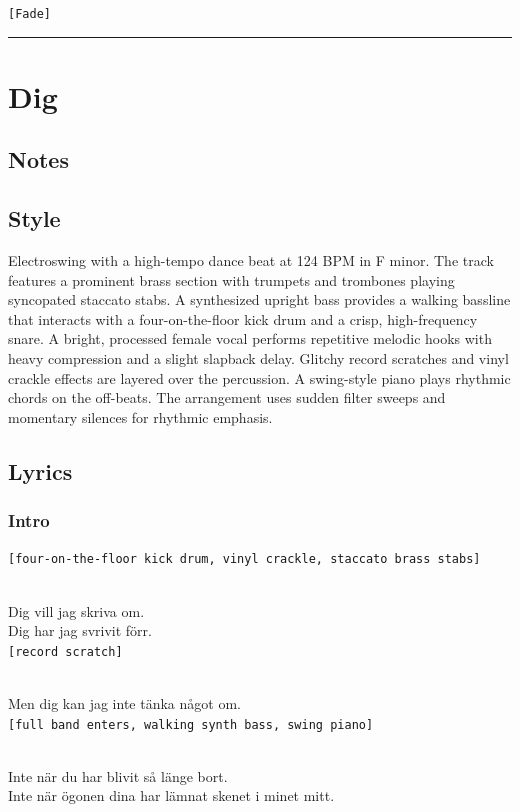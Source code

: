 \documentclass[]{article}
\begin{document}
\texttt{{[}Fade{]}}

\begin{center}\rule{0.5\linewidth}{0.5pt}\end{center}

\section{Dig}\label{dig}

\subsection{Notes}\label{notes-22}

\subsection{Style}\label{style-22}

Electroswing with a high-tempo dance beat at 124 BPM in F minor. The
track features a prominent brass section with trumpets and trombones
playing syncopated staccato stabs. A synthesized upright bass provides a
walking bassline that interacts with a four-on-the-floor kick drum and a
crisp, high-frequency snare. A bright, processed female vocal performs
repetitive melodic hooks with heavy compression and a slight slapback
delay. Glitchy record scratches and vinyl crackle effects are layered
over the percussion. A swing-style piano plays rhythmic chords on the
off-beats. The arrangement uses sudden filter sweeps and momentary
silences for rhythmic emphasis.

\subsection{Lyrics}\label{lyrics-22}

\subsubsection{Intro}\label{intro-10}

\texttt{{[}four-on-the-floor\ kick\ drum,\ vinyl\ crackle,\ staccato\ brass\ stabs{]}}\strut \\
Dig vill jag skriva om.\\
Dig har jag svrivit förr.\\
\texttt{{[}record\ scratch{]}}\strut \\
Men dig kan jag inte tänka något om.\\
\texttt{{[}full\ band\ enters,\ walking\ synth\ bass,\ swing\ piano{]}}\strut \\
Inte när du har blivit så länge bort.\\
Inte när ögonen dina har lämnat skenet i minet mitt.
\end{document}
